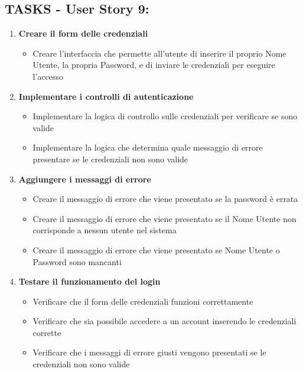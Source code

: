     \subsection*{TASKS - User Story 9:}  
    \begin{enumerate}  
        \item \textbf{Creare il form delle credenziali}  
            \begin{itemize}  
                \item Creare l'interfaccia che permette all'utente di inserire il proprio Nome Utente, la propria Password, e di inviare le credenziali per eseguire l'accesso
            \end{itemize}  
        \item \textbf{Implementare i controlli di autenticazione}  
            \begin{itemize}  
                \item Implementare la logica di controllo sulle credenziali per verificare se sono valide
                \item Implementare la logica che determina quale messaggio di errore presentare se le credenziali non sono valide
            \end{itemize}  
        \item \textbf{Aggiungere i messaggi di errore}  
            \begin{itemize}  
                \item Creare il messaggio di errore che viene presentato se la password è errata
                \item Creare il messaggio di errore che viene presentato se il Nome Utente non corrisponde a nessun utente nel sistema
                \item Creare il messaggio di errore che viene presentato se Nome Utente o Password sono mancanti
            \end{itemize}  
        \item \textbf{Testare il funzionamento del login}  
            \begin{itemize}  
                \item Verificare che il form delle credenziali funzioni correttamente
                \item Verificare che sia possibile accedere a un account inserendo le credenziali corrette
                \item Verificare che i messaggi di errore giusti vengono presentati se le credenziali non sono valide
            \end{itemize} 
    \end{enumerate}
